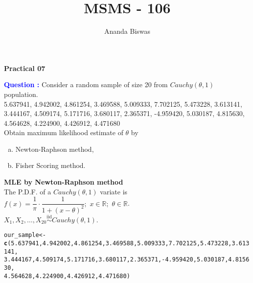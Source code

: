\documentclass[11pt, a4paper]{article}\usepackage[]{graphicx}\usepackage[]{xcolor}
\title{MSMS - 106}
\author{Ananda Biswas}
\date{}
\makeatletter
\newcommand{\hlnum}[1]{\textcolor[rgb]{0.686,0.059,0.569}{#1}}%
\newcommand{\hlopt}[1]{\textcolor[rgb]{0,0,0}{#1}}%
\newcommand{\hldef}[1]{\textcolor[rgb]{0.345,0.345,0.345}{#1}}%
\newcommand{\hlkwb}[1]{\textcolor[rgb]{0.69,0.353,0.396}{#1}}%
\newcommand{\hlkwd}[1]{\textcolor[rgb]{0.737,0.353,0.396}{\textbf{#1}}}%
\newenvironment{kframe}{%
 \def\at@end@of@kframe{}%
 \ifinner\ifhmode%
  \def\at@end@of@kframe{\end{minipage}}%
  \begin{minipage}{\columnwidth}%
 \fi\fi%
 \def\FrameCommand##1{\hskip\@totalleftmargin \hskip-\fboxsep
 \colorbox{shadecolor}{##1}\hskip-\fboxsep
     \hskip-\linewidth \hskip-\@totalleftmargin \hskip\columnwidth}%
 \MakeFramed {\advance\hsize-\width
   \@totalleftmargin\z@ \linewidth\hsize
   \@setminipage}}%
 {\par\unskip\endMakeFramed%
 \at@end@of@kframe}
\newenvironment{knitrout}{}{} %
\makeatother
\begin{document}
\maketitle

\begin{center}
\textbf{Practical 07}
\end{center}


\smallpencil \hspace{0.5cm} \textcolor{blue}{\textbf{Question :}} Consider a random sample of size 20 from $Cauchy(\theta, 1)$ population. \\

5.637941, 4.942002, 4.861254, 3.469588, 5.009333, 7.702125, 5.473228, 3.613141, 3.444167, 4.509174, 5.171716, 3.680117, 2.365371, -4.959420, 5.030187, 4.815630, 4.564628, 4.224900, 4.426912, 4.471680 \\

Obtain maximum likelihood estimate of $\theta$ by 
\begin{enumerate}[(a)]
\item Newton-Raphson method,
\item Fisher Scoring method.
\end{enumerate}

\vspace{0.5cm}

\faArrowAltCircleRight[regular] \hspace{0.5cm} \textbf{MLE by Newton-Raphson method} \\

The P.D.F. of a $Cauchy(\theta, 1)$ variate is $f(x) = \dfrac{1}{\pi} \cdot \dfrac{1}{1 + (x - \theta)^2}; \,\, x \in \mathbb{R}; \,\, \theta \in \mathbb{R}$. \\

$X_1, X_2, \ldots , X_{20} \overset{\text{iid}}{\sim} Cauchy(\theta, 1) $. \\

\begin{knitrout}\footnotesize
{}\color{fgcolor}\begin{kframe}
\begin{alltt}
\hldef{our_sample} \hlkwb{<-} \hlkwd{c}\hldef{(}\hlnum{5.637941}\hldef{,} \hlnum{4.942002}\hldef{,} \hlnum{4.861254}\hldef{,} \hlnum{3.469588}\hldef{,} \hlnum{5.009333}\hldef{,} \hlnum{7.702125}\hldef{,} \hlnum{5.473228}\hldef{,} \hlnum{3.613141}\hldef{,}
                \hlnum{3.444167}\hldef{,} \hlnum{4.509174}\hldef{,} \hlnum{5.171716}\hldef{,} \hlnum{3.680117}\hldef{,} \hlnum{2.365371}\hldef{,} \hlopt{-}\hlnum{4.959420}\hldef{,} \hlnum{5.030187}\hldef{,} \hlnum{4.815630}\hldef{,}
                \hlnum{4.564628}\hldef{,} \hlnum{4.224900}\hldef{,} \hlnum{4.426912}\hldef{,} \hlnum{4.471680}\hldef{)}
\end{alltt}
\end{kframe}
\end{knitrout}
\end{document}
